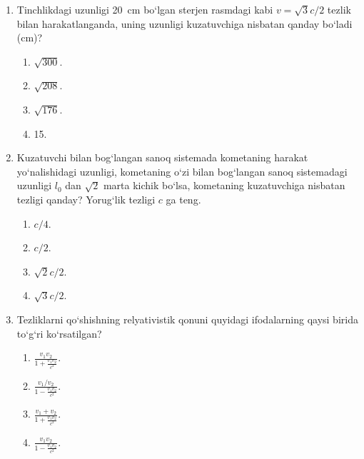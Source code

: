 \begin{enumerate}
\item Tinchlikdagi uzunligi 20~cm bo‘lgan sterjen rasmdagi kabi $v = \sqrt{3}c/2$ tezlik bilan harakatlanganda, uning uzunligi kuzatuvchiga nisbatan qanday bo‘ladi (cm)?

\begin{center}
\end{center}

\begin{enumerate}[label=\Alph*)]
\item $\sqrt{300}$.
\item $\sqrt{208}$.
\item $\sqrt{176}$.
\item 15.
\end{enumerate}

\item Kuzatuvchi bilan bog‘langan sanoq sistemada kometaning harakat yo‘nalishidagi uzunligi, kometaning o‘zi bilan bog‘langan sanoq sistemadagi uzunligi $l_0$ dan $\sqrt{2}$ marta kichik bo‘lsa, kometaning kuzatuvchiga nisbatan tezligi qanday? Yorug‘lik tezligi $c$ ga teng.
\begin{enumerate}[label=\Alph*)]
\item $c/4$.
\item $c/2$.
\item $\sqrt{2}c/2$.
\item $\sqrt{3}c/2$.
\end{enumerate}

\item Tezliklarni qo‘shishning relyativistik qonuni quyidagi ifodalarning qaysi birida to‘g‘ri ko‘rsatilgan?
\begin{enumerate}[label=\Alph*)]
\item $\frac{v_1 v_2}{1+\frac{v_1 v_2}{c^2}}$.
\item $\frac{v_1 / v_2}{1-\frac{v_1 v_2}{c^2}}$.
\item $\frac{v_1 + v_2}{1+\frac{v_1 v_2}{c^2}}$.
\item $\frac{v_1 v_2}{1-\frac{v_1 v_2}{c^2}}$.
\end{enumerate}


\end{enumerate}
